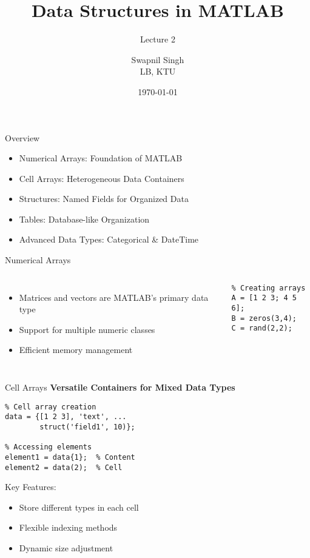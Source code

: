 \documentclass[10pt]{beamer}
\title{Data Structures in MATLAB}
\subtitle{Lecture 2}
\author{Swapnil Singh\\LB, KTU}
\date{\today}
\theoremstyle{plain}%
\theoremstyle{definition}
\theoremstyle{remark}
\begin{document}
\begin{frame}
\titlepage
\end{frame}



\begin{frame}[fragile]{Overview}
    \begin{itemize}
        \item Numerical Arrays: Foundation of MATLAB
        \item Cell Arrays: Heterogeneous Data Containers
        \item Structures: Named Fields for Organized Data
        \item Tables: Database-like Organization
        \item Advanced Data Types: Categorical \& DateTime
    \end{itemize}
\end{frame}

\begin{frame}[fragile]{Numerical Arrays}
    \begin{columns}
        \begin{itemize}
            \item Matrices and vectors are MATLAB's primary data type
            \item Support for multiple numeric classes
            \item Efficient memory management
        \end{itemize}
        
        \begin{lstlisting}
% Creating arrays
A = [1 2 3; 4 5 6];
B = zeros(3,4);
C = rand(2,2);
        \end{lstlisting}
    \end{columns}
\end{frame}

\begin{frame}[fragile]{Cell Arrays}
    \textbf{Versatile Containers for Mixed Data Types}
    \begin{lstlisting}
% Cell array creation
data = {[1 2 3], 'text', ...
        struct('field1', 10)};
        
% Accessing elements
element1 = data{1};  % Content
element2 = data(2);  % Cell
    \end{lstlisting}
    \vspace{0.5cm}
    Key Features:
    \begin{itemize}
        \item Store different types in each cell
        \item Flexible indexing methods
        \item Dynamic size adjustment
    \end{itemize}
\end{frame}
\end{document}
